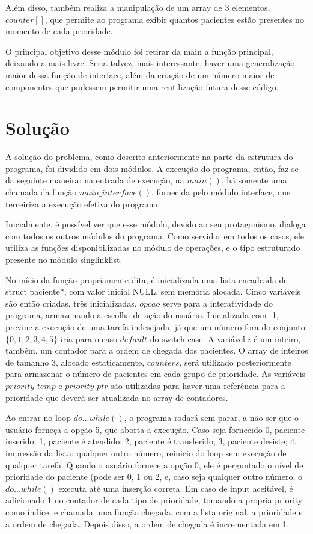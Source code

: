 \documentclass{article}
\begin{document}
Além disso, também realiza a manipulação de um array de 3 elementos, $counter[]$, que permite ao programa exibir quantos pacientes estão presentes no momento de cada prioridade.

O principal objetivo desse módulo foi retirar da main a função principal, deixando-a mais livre. Seria talvez, mais interessante, haver uma generalização maior dessa função de interface, além da criação de um número maior de componentes que pudessem permitir uma reutilização futura desse código. 

\section{Solução}
A solução do problema, como descrito anteriormente na parte da estrutura do programa, foi dividido em dois módulos. A execução do programa, então, faz-se da seguinte maneira: na entrada de execução, na $main()$, há somente uma chamada da função $main\_interface()$, fornecida pelo módulo interface, que terceiriza a execução efetiva do programa. 

Inicialmente, é possível ver que esse módulo, devido ao seu protagonismo, dialoga com todos os outros módulos do programa. Como servidor em todos os casos, ele utiliza as funções disponibilizadas no módulo de operações, e o tipo estruturado presente no módulo singlinklist. 

No início da função propriamente dita, é inicializada uma lista encadeada de struct paciente*, com valor inicial NULL, sem memória alocada. Cinco variáveis são então criadas, três inicializadas. $opcao$ serve para a interatividade do programa, armazenando a escolha de ação do usuário. Inicializada com -1, previne a execução de uma tarefa indesejada, já que um número fora do conjunto $\{0, 1, 2, 3, 4, 5\}$ iria para o caso $default$ do switch case. A variável $i$ é um inteiro, também, um contador para a ordem de chegada dos pacientes. O array de inteiros de tamanho 3, alocado estaticamente, $counters$, será utilizado posteriormente para armazenar o número de pacientes em cada grupo de prioridade. As variáveis $priority\_temp$ e $priority\_ptr$ são utilizadas para haver uma referência para a prioridade que deverá ser atualizada no array de contadores.
 
Ao entrar no loop $do...while()$, o programa rodará sem parar, a não ser que o usuário forneça a opção 5, que aborta a execução. Caso seja fornecido 0, paciente inserido; 1, paciente é atendido; 2, paciente é transferido; 3, paciente desiste; 4, impressão da lista; qualquer outro número, reinicio do loop sem execução de qualquer tarefa. Quando o usuário fornece a opção 0, ele é perguntado o nível de prioridade do paciente (pode ser 0, 1 ou 2, e, caso seja qualquer outro número, o  $do...while()$ executa até uma inserção correta. Em caso de input aceitável, é adicionado 1 no contador de cada tipo de prioridade, tomando a propria priority como índice, e chamada uma função chegada, com a lista original, a prioridade e a ordem de chegada. Depois disso, a ordem de chegada é incrementada em 1.
\end{document}

